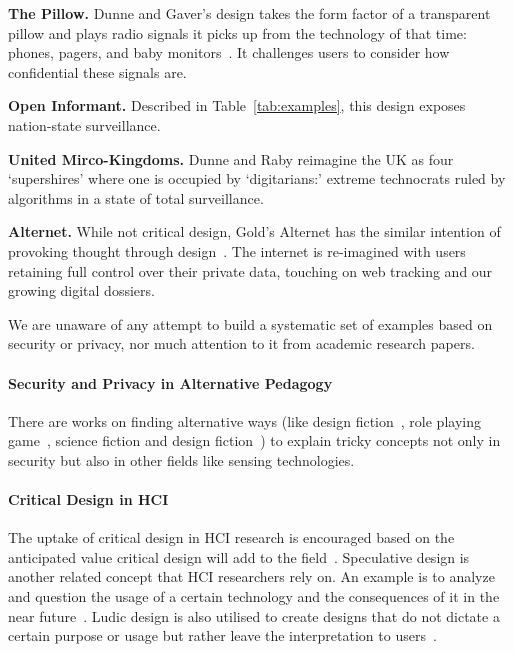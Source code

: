 \begin{compactlist}
\item \textbf{The Pillow.} Dunne and Gaver's design takes the form factor of a transparent pillow and plays radio signals it picks up from the technology of that time: \eg phones, pagers, and baby monitors~\cite{DuGa97}. It challenges users to consider how confidential these signals are.  
\item \textbf{Open Informant.} Described in Table~\ref{tab:examples}, this design exposes nation-state surveillance.
\item \textbf{United Mirco-Kingdoms.} Dunne and Raby reimagine the UK as four `supershires' where one is occupied by `digitarians:' extreme technocrats ruled by algorithms in a state of total surveillance.  
\item \textbf{Alternet.} While not critical design, Gold's Alternet has the similar intention of provoking thought through design~\cite{Gol14}. The internet is re-imagined with users retaining full control over their private data, touching on web tracking and our growing digital dossiers. 
\end{compactlist}

We are unaware of any attempt to build a systematic set of examples based on security or privacy, nor much attention to it from academic research papers.

\paragraph{Security and Privacy in Alternative Pedagogy}
There are works on finding alternative ways (like design fiction~\cite{loureiro-koechlin_vision_2022}, role playing game~\cite{merrill_security_2020}, science fiction and design fiction~\cite{wong_real-fictional_2017}) to explain tricky concepts not only in security but also in other fields like sensing technologies.

\paragraph{Critical Design in HCI}
The uptake of critical design in HCI research is encouraged based on the anticipated value critical design will add to the field~\cite{bardzell_what_2013}. Speculative design is another related concept that HCI researchers rely on. An example is to analyze and question the usage of a certain technology and the consequences of it in the near future~\cite{lawson_problematising_2015}. Ludic design is also utilised to create designs that do not dictate a certain purpose or usage but rather leave the interpretation to users~\cite{gaver_drift_2004}.

